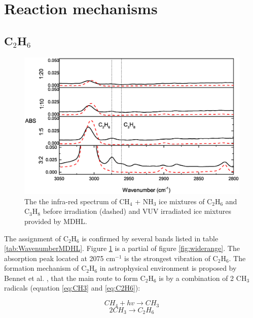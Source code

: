 \section{Reaction mechanisms}

\subsection{C$_2$H$_6$}

\begin{figure}
\centering
\includegraphics[width=\textwidth]{figures/chapter3/C2H6.eps}
\caption{The the infra-red spectrum of CH$_4$ + NH$_3$ ice mixtures of C$_2$H$_6$ and C$_3$H$_8$ before irradiation (dashed) and VUV irradiated ice mixtures provided by MDHL. }
\label{fig:C2H6}
\end{figure}

The assignment of C$_2$H$_6$ is confirmed by several bands listed in table \ref{tab:WavenumberMDHL}. Figure \ref{fig:C2H6} is a partial of figure \ref{fig:widerange}. The absorption peak located at 2075 cm$^{-1}$ is the strongest vibration of C$_2$H$_6$. The formation mechanism of C$_2$H$_6$ in astrophysical environment is proposed by Bennet et al. \cite{bennett2006laboratory}, that the main route to form C$_2$H$_6$ is by a combination of 2 CH$_3$ radicals (equation \ref{eq:CH3} and \ref{eq:C2H6}):

\begin{equation}
CH_4 + hv \rightarrow CH_3
\label{eq:CH3}
\end{equation}
\begin{equation}
2 CH_3 \rightarrow C_2H_6
\label{eq:C2H6}
\end{equation}

